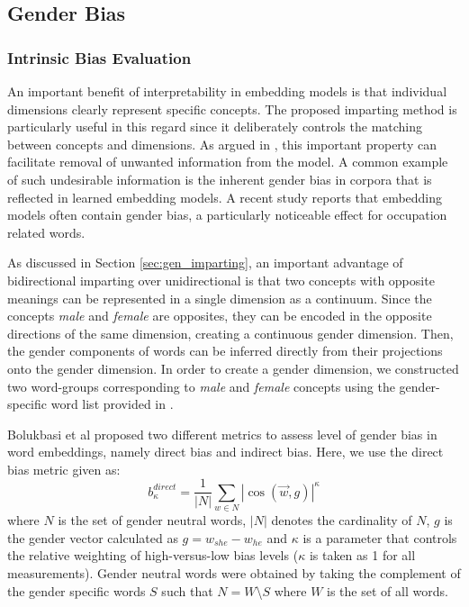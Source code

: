 \documentclass[11pt,a4paper]{article}
\begin{document}
\subsection{Gender Bias} \label{sec:gender_bias}
 
\subsubsection{Intrinsic Bias Evaluation}
 
An important benefit of interpretability in embedding models is that individual dimensions clearly represent specific concepts. The proposed imparting method is particularly useful in this regard since it deliberately controls the matching between concepts and dimensions. As argued in \citep{dufter19ultraDense}, this important property can facilitate removal of unwanted information from the model. A common example of such undesirable information is the inherent gender bias in corpora that is reflected in learned embedding models. A recent study \citep{bolukbasi16debiasing} reports that embedding models often contain gender bias, a particularly noticeable effect for occupation related words. 

As discussed in Section \ref{sec:gen_imparting}, an important advantage of bidirectional imparting over unidirectional is that two concepts with opposite meanings can be represented in a single dimension as a continuum. Since the concepts \textit{male} and \textit{female} are opposites, they can be encoded in the opposite directions of the same dimension, creating a continuous gender dimension. Then, the gender components of words can be inferred directly from their projections onto the gender dimension. In order to create a gender dimension, we constructed two word-groups corresponding to \textit{male} and \textit{female} concepts using the gender-specific word list provided in \citep{bolukbasi16debiasing}. 

Bolukbasi et al \citep{bolukbasi16debiasing} proposed two different metrics to assess level of gender bias in word embeddings, namely direct bias and indirect bias. Here, we use the direct bias metric given as:
\begin{equation}
b^{direct}_\kappa = \frac{1}{|N|}\sum_{w\in N}|\cos(\vec{w},g)|^\kappa
\label{eq:direct_bias}
\end{equation}
where $N$ is the set of gender neutral words, $|N|$ denotes the cardinality of $N$, $g$ is the gender vector calculated as $g = w_{she} - w_{he}$ and $\kappa$ is a parameter that controls the relative weighting of high-versus-low bias levels ($\kappa$ is taken as 1 for all measurements). Gender neutral words were obtained by taking the complement of the gender specific words $S$ such that $N = W$\textbackslash $S$ where $W$ is the set of all words. 
\end{document}
